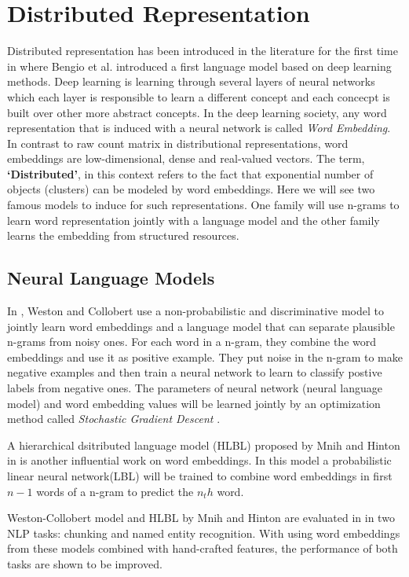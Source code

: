 \documentclass[12pt]{report}
\begin{document}
\section{Distributed Representation}
\label{sec:disted-repr}
Distributed representation has been introduced in the literature for the first
time in \cite{Bengio2003} where Bengio et al. introduced a first language
model based on deep learning methods\cite{Bengio2009b}. Deep learning is
learning through several layers of neural networks which each layer is
responsible to learn a different concept and each concecpt is built over other
more abstract concepts. In the deep learning society, any word representation
that is induced with a neural network is called \emph{Word Embedding}. 
In contrast to raw count matrix in distributional representations, word embeddings are low-dimensional, dense and real-valued vectors.
 The term, \textbf{`Distributed'}, in this context refers to the fact that
 exponential number of objects (clusters) can be modeled by word embeddings.
 Here we will see two famous models to induce for such representations. One
 family will use n-grams to learn word representation jointly with a language
 model and the other family learns the embedding from structured resources.

\subsection{Neural Language Models}
\label{subsec:lang-model}

In \cite{Collobert2008a}, Weston and Collobert use a non-probabilistic and
discriminative model to jointly learn word embeddings and a language model that
can separate plausible n-grams from noisy ones. For each word in a n-gram, they
combine the word embeddings and use it as positive example. They put noise in
the n-gram to make negative examples and then train a neural network to learn to
classify postive labels from negative ones. The parameters of neural network
(neural language model) and word embedding values will be learned jointly by an
optimization method called \emph{Stochastic Gradient Descent} \cite{Bottou2010}.

A hierarchical dsitributed language model (HLBL) proposed by Mnih and
Hinton in \cite{Mnih2009} is another influential work on word embeddings. In
this model a probabilistic linear neural network(LBL) will be trained to 
combine word embeddings in first $n-1$ words of a n-gram to predict the $n_th$ word.

Weston-Collobert model and HLBL by Mnih and Hinton are evaluated in
\cite{Turian2010b} in two NLP tasks: chunking and named entity recognition. With
using word embeddings from these models combined with hand-crafted features, the
performance of both tasks are shown to be improved.
\end{document}
